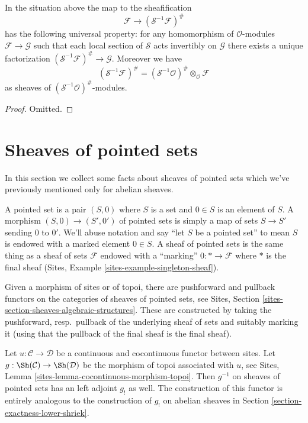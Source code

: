\begin{lemma}
\label{lemma-simple-invert-module}
In the situation above the map to the sheafification
$$
\mathcal{F} \longrightarrow (\mathcal{S}^{-1}\mathcal{F})^\#
$$
has the following universal property: for any homomorphism
of $\mathcal{O}$-modules $\mathcal{F} \to \mathcal{G}$ such
that each local section of $\mathcal{S}$ acts invertibly on $\mathcal{G}$
there exists a unique factorization
$(\mathcal{S}^{-1}\mathcal{F})^\# \to \mathcal{G}$.
Moreover we have
$$
(\mathcal{S}^{-1}\mathcal{F})^\#
=
(\mathcal{S}^{-1}\mathcal{O})^\# \otimes_\mathcal{O} \mathcal{F}
$$
as sheaves of $(\mathcal{S}^{-1}\mathcal{O})^\#$-modules.
\end{lemma}

\begin{proof}
Omitted.
\end{proof}









\section{Sheaves of pointed sets}
\label{section-pointed}

\noindent
In this section we collect some facts about sheaves of pointed sets
which we've previously mentioned only for abelian sheaves.

\medskip\noindent
A pointed set is a pair $(S, 0)$ where $S$ is a set and $0 \in S$
is an element of $S$. A morphism $(S, 0) \to (S', 0')$ of pointed sets
is simply a map of sets $S \to S'$ sending $0$ to $0'$. We'll abuse
notation and say ``let $S$ be a pointed set'' to mean $S$ is endowed
with a marked element $0 \in S$. A sheaf of pointed sets is
the same thing as a sheaf of sets $\mathcal{F}$ endowed with a
``marking'' $0 : * \to \mathcal{F}$ where $*$ is the final sheaf
(Sites, Example \ref{sites-example-singleton-sheaf}).

\medskip\noindent
Given a morphism of sites or of topoi, there are pushforward
and pullback functors on the categories of sheaves of pointed sets, see
Sites, Section \ref{sites-section-sheaves-algebraic-structures}.
These are constructed by taking the pushforward, resp.\ pullback
of the underlying sheaf of sets and suitably marking it (using
that the pullback of the final sheaf is the final sheaf).

\medskip\noindent
Let $u : \mathcal{C} \to \mathcal{D}$ be a continuous and cocontinuous
functor between sites. Let $g : \Sh(\mathcal{C}) \to \Sh(\mathcal{D})$
be the morphism of topoi associated with $u$, see
Sites, Lemma \ref{sites-lemma-cocontinuous-morphism-topoi}.
Then $g^{-1}$ on sheaves of pointed sets has an left adjoint $g_!$
as well. The construction of this functor is entirely analogous to
the construction of $g_!$ on abelian sheaves in
Section \ref{section-exactness-lower-shriek}.

